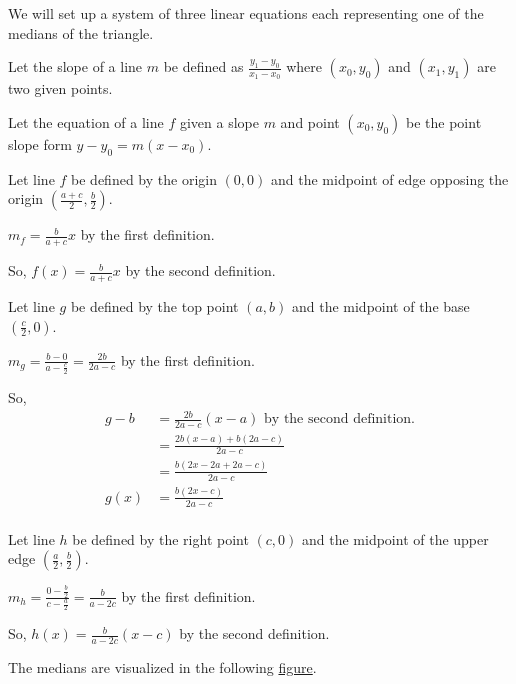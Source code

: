 \documentclass{article}
\begin{document}
We will set up a system of three linear equations each representing one of the medians of the triangle.

Let the slope of a line $m$ be defined as $\frac{y_1-y_0}{x_1-x_0}$ where $(x_0,y_0)$ and $(x_1,y_1)$ are two given points.

Let the equation of a line $f$ given a slope $m$ and point $(x_0,y_0)$ be the point slope form $y-y_0 = m(x-x_0)$.

Let line $f$ be defined by the origin $(0,0)$ and the midpoint of edge opposing the origin $\left( \frac{a+c}{2}, \frac{b}{2} \right)$.

$m_f = \frac{b}{a+c} x$ by the first definition.

So, $f(x) = \frac{b}{a+c} x$ by the second definition.

Let line $g$ be defined by the top point $(a,b)$ and the midpoint of the base $\left( \frac{c}{2}, 0 \right)$.

$m_g = \frac{b-0}{a-\frac{c}{2}} = \frac{2b}{2a-c}$ by the first definition.

So, 
\begin{align*}
    g-b &= \frac{2b}{2a-c} (x-a) \text{ by the second definition.}\\
    &= \frac{2b(x-a)+b(2a-c)}{2a-c} \\
    &= \frac{b(2x-2a+2a-c)}{2a-c} \\
    g(x) &= \frac{b(2x-c)}{2a-c} \\
\end{align*}

Let line $h$ be defined by the right point $(c,0)$ and the midpoint of the upper edge $\left( \frac{a}{2}, \frac{b}{2} \right)$.

$m_h = \frac{0-\frac{b}{2}}{c-\frac{a}{2}} = \frac{b}{a-2c}$ by the first definition.

So, $h(x) = \frac{b}{a-2c} (x-c)$ by the second definition.

The medians are visualized in the following \href{https://www.desmos.com/calculator/fowljkwimc}{figure}.
\end{document}
